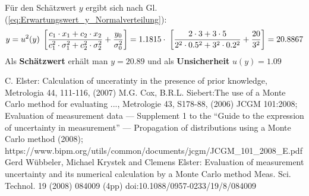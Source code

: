 Für den Schätzwert $y$ ergibt sich nach Gl.(\ref{eq:Erwartungswert_y_Normalverteilung}):
\[
y = u^2(y) \;\left[ \frac{\textstyle c_1\cdot x_1 + c_2\cdot x_2}
{\textstyle c_1^2 \cdot \sigma_1^2 + c_2^2\cdot \sigma_2^2} +\frac{y_0}{\sigma_0^2} \right]
 = 1.1815 \cdot \; \left[\frac{2\cdot 3 + 3\cdot 5}
{2^2 \cdot 0.5^2 + 3^2\cdot 0.2^2} + \frac{20}{3^2} \right] = 20.8867
\]
Als \textbf{Schätzwert} erhält man $y=20.89$ und als \textbf{Unsicherheit} $u(y)= 1.09 $


\begin{thebibliography}{------}
	\item[] \hspace*{5em}{\Large\bf zu Kapitel 10:}
		 C. Elster: Calculation of unceratinty
		in the presence of prior knowledge, Metrologia 44, 111-116, (2007)
		 M.G. Cox, B.R.L. Siebert:The use of
		a Monte Carlo method for evaluating ..., Metrologie 43, S178-88,
		(2006)
		JCGM 101:2008; Evaluation of measurement data — Supplement 1 to the 
		“Guide to the expression of uncertainty in measurement” — 
		Propagation of distributions using a Monte Carlo method (2008); \newline 
		https://www.bipm.org/utils/common/documents/jcgm/JCGM\_101\_2008\_E.pdf
		 Gerd Wübbeler, Michael Krystek and Clemens Elster: Evaluation of measurement uncertainty
		and its numerical calculation by a Monte Carlo method
		Meas. Sci. Technol. 19 (2008) 084009 (4pp)
		doi:10.1088/0957-0233/19/8/084009
\end{thebibliography}